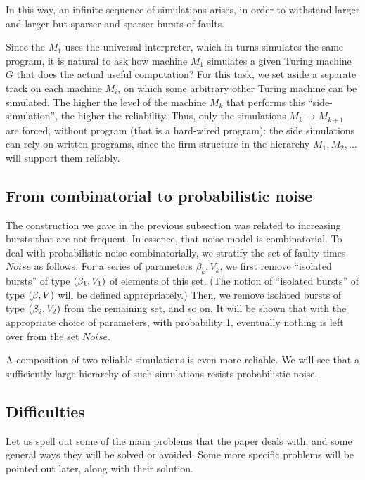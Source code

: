 \documentclass[11pt]{memoir}
\theoremstyle{definition} %
\newcommand{\Noise}{\mathit{Noise}}
\begin{document}
In this way, an infinite sequence of simulations arises, in order
to withstand larger and larger but sparser and sparser bursts of faults.

Since the \( M_{1} \) uses the universal interpreter, which in turns
simulates the same program, it is natural to ask
how  machine \( M_{1} \) simulates a given Turing machine \( G \) that does the 
actual useful computation?
For this task, we set aside a separate track 
on each machine \( M_{i} \), on which some arbitrary other Turing machine can be
simulated.
The higher the level of the machine \( M_{k} \) that performs this
``side-simulation'', the higher the reliability.
Thus, only the simulations \( M_{k}\to M_{k+1} \) are forced, without program
(that is a hard-wired program):
the side simulations can rely on written programs, since the firm
structure in the hierarchy \( M_{1},M_{2},\dots \) will support them reliably.



\subsection{From combinatorial to probabilistic noise}

The construction we gave in the previous subsection
was related to increasing bursts that are not frequent.
In essence, that noise model is combinatorial.
To deal with probabilistic noise combinatorially,
we stratify the set of faulty times \( \Noise \) as follows.
For a series of parameters \( \beta_{k}, V_{k} \),
we first remove ``isolated bursts'' of type \( (\beta_{1},V_{1}) \) of elements of this set.
(The notion of ``isolated bursts'' of type \( (\beta,V) \)
will be defined appropriately.)
Then, we remove isolated bursts of type \( (\beta_{2},V_{2}) \) from the remaining set,
and so on.
It will be shown that with the appropriate choice of parameters, with probability 1,
eventually nothing is left over from the set \( \Noise \).

A composition of two reliable simulations is even more reliable.
We will see that a sufficiently large hierarchy of such
simulations resists probabilistic noise.


\subsection{Difficulties}\label{sec:novelties}

Let us spell out some of the main problems that the paper deals with, 
and some general ways they will be solved or avoided.
Some more specific problems will be pointed out later, along with their solution.
\end{document}
